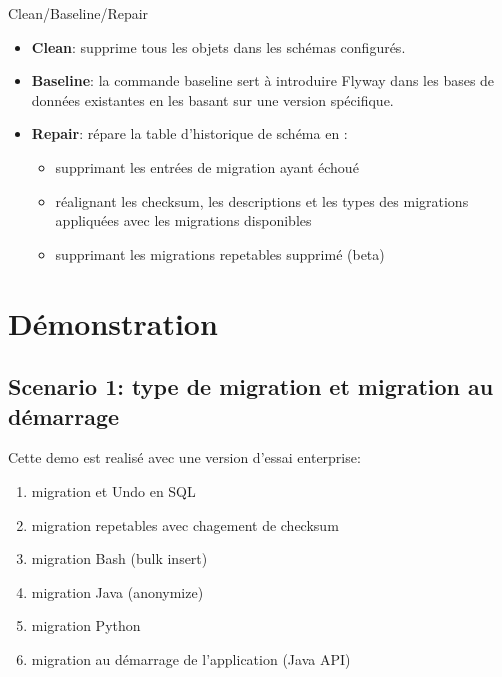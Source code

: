 \documentclass[slidestop,compress,11pt,xcolor=dvipsnames,french]{beamer}
\begin{document}
\begin{frame}{Clean/Baseline/Repair}
\vspace{1cm}
\begin{itemize}
 \item \textbf{Clean}: supprime tous les objets dans les schémas configurés.
 \item \textbf{Baseline}: la commande baseline sert à introduire Flyway dans les bases de données existantes en les basant sur une version spécifique.
 \item \textbf{Repair}: répare la table d'historique de schéma en :
    \begin{itemize}
        \item supprimant les entrées de migration ayant échoué
        \item réalignant les checksum, les descriptions et les types des migrations appliquées avec les migrations disponibles
        \item supprimant les migrations repetables supprimé (beta)
    \end{itemize}
\end{itemize}
\end{frame}

\section[Démo]{Démonstration}
\subsection*{Scenario 1: type de migration et migration au démarrage}
\begin{frame}
Cette demo est realisé avec une version d'essai enterprise: 
\begin{enumerate}
 \item migration et Undo en SQL 
 \item migration repetables avec chagement de checksum
 \item migration Bash (bulk insert)
 \item migration Java (anonymize)
 \item migration Python 
 \item migration au démarrage de l'application (Java API)
\end{enumerate}
\end{frame}
\end{document}
